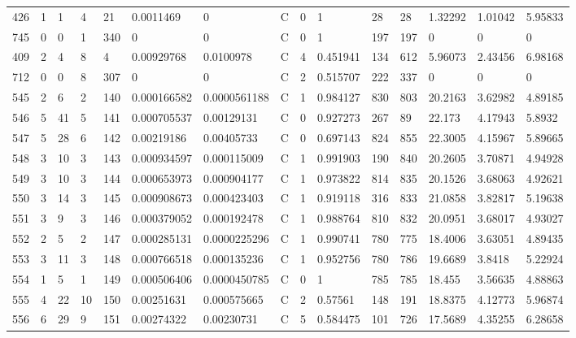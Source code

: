 \begin{latin}
\begin{longtable}{lllllllllllllll}
	426 & 1  & 1   & 4  & 21  & 0.0011469      & 0              & C & 0  & 1        & 28   & 28   & 1.32292 & 1.01042 & 5.95833 \\
	745 & 0  & 0   & 1  & 340 & 0              & 0              & C & 0  & 1        & 197  & 197  & 0       & 0       & 0       \\
	409 & 2  & 4   & 8  & 4   & 0.00929768     & 0.0100978      & C & 4  & 0.451941 & 134  & 612  & 5.96073 & 2.43456 & 6.98168 \\
	712 & 0  & 0   & 8  & 307 & 0              & 0              & C & 2  & 0.515707 & 222  & 337  & 0       & 0       & 0       \\
	545 & 2  & 6   & 2  & 140 & 0.000166582    & 0.0000561188   & C & 1  & 0.984127 & 830  & 803  & 20.2163 & 3.62982 & 4.89185 \\
	546 & 5  & 41  & 5  & 141 & 0.000705537    & 0.00129131     & C & 0  & 0.927273 & 267  & 89   & 22.173  & 4.17943 & 5.8932  \\
	547 & 5  & 28  & 6  & 142 & 0.00219186     & 0.00405733     & C & 0  & 0.697143 & 824  & 855  & 22.3005 & 4.15967 & 5.89665 \\
	548 & 3  & 10  & 3  & 143 & 0.000934597    & 0.000115009    & C & 1  & 0.991903 & 190  & 840  & 20.2605 & 3.70871 & 4.94928 \\
	549 & 3  & 10  & 3  & 144 & 0.000653973    & 0.000904177    & C & 1  & 0.973822 & 814  & 835  & 20.1526 & 3.68063 & 4.92621 \\
	550 & 3  & 14  & 3  & 145 & 0.000908673    & 0.000423403    & C & 1  & 0.919118 & 316  & 833  & 21.0858 & 3.82817 & 5.19638 \\
	551 & 3  & 9   & 3  & 146 & 0.000379052    & 0.000192478    & C & 1  & 0.988764 & 810  & 832  & 20.0951 & 3.68017 & 4.93027 \\
	552 & 2  & 5   & 2  & 147 & 0.000285131    & 0.0000225296   & C & 1  & 0.990741 & 780  & 775  & 18.4006 & 3.63051 & 4.89435 \\
	553 & 3  & 11  & 3  & 148 & 0.000766518    & 0.000135236    & C & 1  & 0.952756 & 780  & 786  & 19.6689 & 3.8418  & 5.22924 \\
	554 & 1  & 5   & 1  & 149 & 0.000506406    & 0.0000450785   & C & 0  & 1        & 785  & 785  & 18.455  & 3.56635 & 4.88863 \\
	555 & 4  & 22  & 10 & 150 & 0.00251631     & 0.000575665    & C & 2  & 0.57561  & 148  & 191  & 18.8375 & 4.12773 & 5.96874 \\
	556 & 6  & 29  & 9  & 151 & 0.00274322     & 0.00230731     & C & 5  & 0.584475 & 101  & 726  & 17.5689 & 4.35255 & 6.28658 \\

\end{longtable}
\end{latin}
